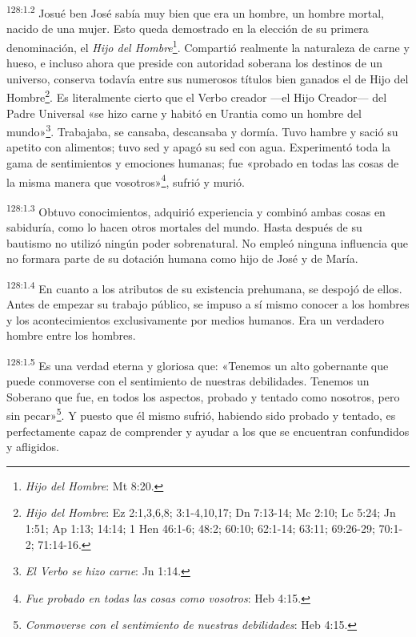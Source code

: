 \par 
\textsuperscript{128:1.2} Josué ben José sabía muy bien que era un hombre, un hombre mortal, nacido de una mujer. Esto queda demostrado en la elección de su primera denominación, el \textit{Hijo del Hombre}\footnote{\textit{Hijo del Hombre}: Mt 8:20.}. Compartió realmente la naturaleza de carne y hueso, e incluso ahora que preside con autoridad soberana los destinos de un universo, conserva todavía entre sus numerosos títulos bien ganados el de Hijo del Hombre\footnote{\textit{Hijo del Hombre}: Ez 2:1,3,6,8; 3:1-4,10,17; Dn 7:13-14; Mc 2:10; Lc 5:24; Jn 1:51; Ap 1:13; 14:14; 1 Hen 46:1-6; 48:2; 60:10; 62:1-14; 63:11; 69:26-29; 70:1-2; 71:14-16.}. Es literalmente cierto que el Verbo creador ---el Hijo Creador--- del Padre Universal «se hizo carne y habitó en Urantia como un hombre del mundo»\footnote{\textit{El Verbo se hizo carne}: Jn 1:14.}. Trabajaba, se cansaba, descansaba y dormía. Tuvo hambre y sació su apetito con alimentos; tuvo sed y apagó su sed con agua. Experimentó toda la gama de sentimientos y emociones humanas; fue «probado en todas las cosas de la misma manera que vosotros»\footnote{\textit{Fue probado en todas las cosas como vosotros}: Heb 4:15.}, sufrió y murió.

\par 
\textsuperscript{128:1.3} Obtuvo conocimientos, adquirió experiencia y combinó ambas cosas en sabiduría, como lo hacen otros mortales del mundo. Hasta después de su bautismo no utilizó ningún poder sobrenatural. No empleó ninguna influencia que no formara parte de su dotación humana como hijo de José y de María.

\par 
\textsuperscript{128:1.4} En cuanto a los atributos de su existencia prehumana, se despojó de ellos. Antes de empezar su trabajo público, se impuso a sí mismo conocer a los hombres y los acontecimientos exclusivamente por medios humanos. Era un verdadero hombre entre los hombres.

\par 
\textsuperscript{128:1.5} Es una verdad eterna y gloriosa que: «Tenemos un alto gobernante que puede conmoverse con el sentimiento de nuestras debilidades. Tenemos un Soberano que fue, en todos los aspectos, probado y tentado como nosotros, pero sin pecar»\footnote{\textit{Conmoverse con el sentimiento de nuestras debilidades}: Heb 4:15.}. Y puesto que él mismo sufrió, habiendo sido probado y tentado, es perfectamente capaz de comprender y ayudar a los que se encuentran confundidos y afligidos.

